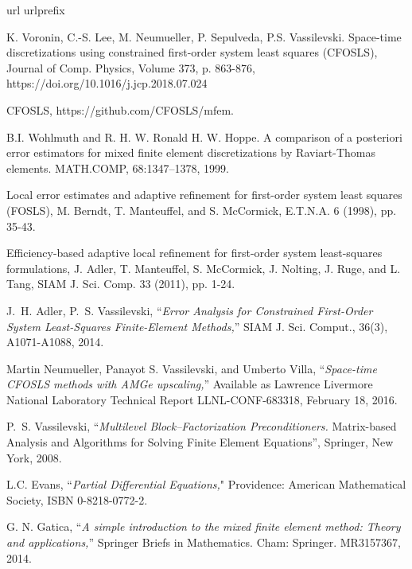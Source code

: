 \documentclass[a4paper,12pt]{amsart}
\numberwithin{equation}{section}
\begin{document}
\begin{thebibliography}{99}
\expandafter\ifx\csname url\endcsname\relax
  \def\url#1{\texttt{#1}}\fi
\expandafter\ifx\csname urlprefix\endcsname\relax\def\urlprefix{URL }\fi

K. Voronin, C.-S. Lee, M. Neumueller, P. Sepulveda, P.S. Vassilevski. Space-time discretizations using constrained first-order system least squares (CFOSLS), Journal of Comp. Physics, Volume 373, p. 863-876, https://doi.org/10.1016/j.jcp.2018.07.024

CFOSLS, https://github.com/CFOSLS/mfem.

B.I. Wohlmuth and R. H. W. Ronald H. W. Hoppe. A comparison of a posteriori error estimators for mixed finite element discretizations by Raviart-Thomas elements. MATH.COMP, 68:1347–1378, 1999.

Local error estimates and adaptive refinement for first-order system least squares (FOSLS), M. Berndt, T. Manteuffel, and S. McCormick, E.T.N.A. 6 (1998), pp. 35-43.

Efficiency-based adaptive local refinement for first-order system least-squares formulations, J. Adler, T. Manteuffel, S. McCormick, J. Nolting, J. Ruge, and L. Tang, SIAM J. Sci. Comp. 33 (2011), pp. 1-24. 

{\sc J.~H. Adler, P.~S. Vassilevski,}
``{\em Error Analysis for Constrained First-Order System Least-Squares Finite-Element Methods,}''
SIAM J. Sci. Comput., 36(3), A1071-A1088, 2014.

Martin Neumueller, Panayot S. Vassilevski, and Umberto Villa,
``{\em Space-time CFOSLS methods with AMGe upscaling,}''
Available as Lawrence Livermore National Laboratory Technical Report LLNL-CONF-683318, February 18, 2016.

{\sc P.~S. Vassilevski,}
``{\em Multilevel Block--Factorization Preconditioners.} 
Matrix-based Analysis and Algorithms for Solving Finite Element Equations'',
Springer, New York, 2008.

{\sc L.C. Evans,}
 ``{\em Partial Differential Equations,}" Providence: American Mathematical Society, ISBN 0-8218-0772-2. 

{\sc  G. N. Gatica,} ``{\em A simple introduction to the mixed finite element method: Theory and applications,}'' Springer Briefs in Mathematics. Cham: Springer. MR3157367, 2014.


\end{thebibliography}
\end{document}
